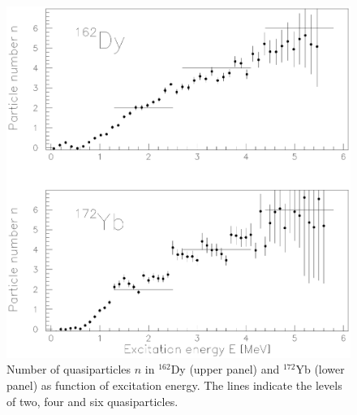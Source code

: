 \begin{figure}
\includegraphics[totalheight=17.5cm,angle=0,bb=0 80 350 730]{fig11.ps}
\caption{Number of quasiparticles $n$ in $^{162}$Dy (upper panel) and $^{172}$Yb (lower panel) as function of excitation energy. The lines indicate the levels of two, four and six quasiparticles.}
\label{fig:fig11}
\end{figure}



